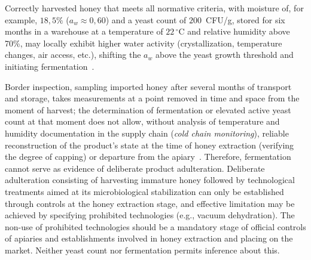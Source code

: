 Correctly harvested honey that meets all normative criteria,
with moisture of, for example, $18{,}5\%$ ($a_w \approx 0{,}60$)
and a yeast count of $200$~CFU/g, stored for six months in a
warehouse at a temperature of $22\,^\circ$C and relative humidity
above 70\%, may locally exhibit higher water activity
(crystallization, temperature changes, air access, etc.), shifting
the $a_w$ above the yeast growth threshold and initiating
fermentation~\cite{apinz2021}.

Border inspection, sampling imported honey after several months
of transport and storage, takes measurements at a point removed
in time and space from the moment of harvest; the determination of
fermentation or elevated active yeast count at that moment does not
allow, without analysis of temperature and humidity documentation
in the supply chain (\textit{cold chain monitoring}), reliable
reconstruction of the product's state at the time of honey
extraction (verifying the degree of capping) or departure from
the apiary~\cite{tsagkaris2021,schoder2026}.
Therefore, fermentation cannot serve as evidence of deliberate
product adulteration. Deliberate adulteration consisting of
harvesting immature honey followed by technological treatments
aimed at its microbiological stabilization can only be established
through controls at the honey extraction stage, and effective
limitation may be achieved by specifying prohibited technologies
(e.g., vacuum dehydration). The non-use of prohibited technologies
should be a mandatory stage of official controls of apiaries and
establishments involved in honey extraction and placing on the
market. Neither yeast count nor fermentation permits inference
about this.
